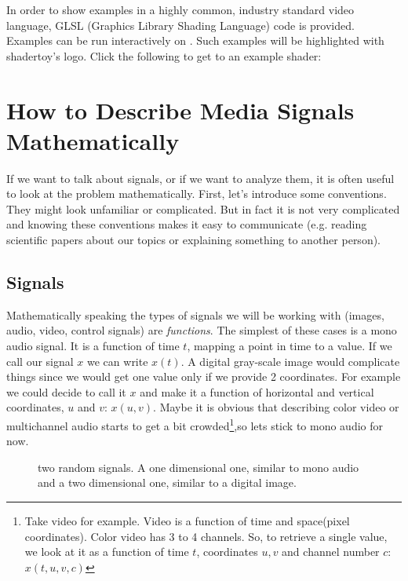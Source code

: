 In order to show examples in a highly common, industry standard video language, GLSL (Graphics Library Shading Language) code is provided. Examples can be run interactively on . Such examples will be highlighted with shadertoy's logo. Click the following to get to an example shader:

\section{How to Describe Media Signals Mathematically}

If we want to talk about signals, or if we want to analyze them, it is often useful to look at the problem mathematically. First, let's introduce some conventions. They might look unfamiliar or complicated. But in fact it is not very complicated and knowing these conventions makes it easy to communicate (e.g. reading scientific papers about our topics or explaining something to another person).

\subsection*{Signals}
Mathematically speaking the types of signals we will be working with (images, audio, video, control signals) are \textit{functions}. The simplest of these cases is a mono audio signal. It is a function of time $t$, mapping a point in time to a value. If we call our signal $x$ we can write $x(t)$. A digital gray-scale image would complicate things since we would get one value only if we provide 2 coordinates. For example we could decide to call it $x$ and make it a function of horizontal and vertical coordinates, $u$ and $v$: $x(u,v)$. Maybe it is obvious that describing color video or multichannel audio starts to get a bit crowded\footnote{Take video for example. Video is a function of time and space(pixel coordinates). Color video has 3 to 4 channels. So, to retrieve a single value, we look at it as a function of time $t$, coordinates $u,v$ and channel number $c$: $x(t,u,v,c)$},so lets stick to mono audio for now.  

\begin{figure}[H]
	\centering
	
	\caption[random signals]
	{two random signals. A one dimensional one, similar to mono audio and a two dimensional one, similar to a digital image.}
	\label{fig:randSigs}
\end{figure}



